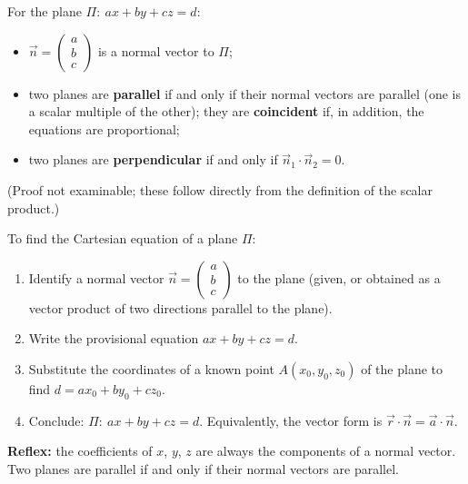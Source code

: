 \documentclass[11pt]{article}
\newcommand{\cle}[1]{{\popxbold\color{popdark}#1}}
\begin{document}
\begin{propriete}
For the plane $\Pi:\ ax+by+cz=d$:
\begin{itemize}
\item $\vec{n} = \begin{pmatrix} a \\ b \\ c \end{pmatrix}$ is a normal vector to $\Pi$;
\item two planes are \textbf{parallel} if and only if their normal vectors are parallel (one is a scalar multiple of the other); they are \textbf{coincident} if, in addition, the equations are proportional;
\item two planes are \textbf{perpendicular} if and only if $\vec{n}_1\cdot\vec{n}_2 = 0$.
\end{itemize}
(Proof not examinable; these follow directly from the definition of the scalar product.)
\end{propriete}

\begin{methode}
To find the Cartesian equation of a plane $\Pi$:
\begin{enumerate}
\item Identify a \cle{normal vector} $\vec{n} = \begin{pmatrix} a \\ b \\ c \end{pmatrix}$ to the plane (given, or obtained as a vector product of two directions parallel to the plane).
\item Write the provisional equation $ax + by + cz = d$.
\item Substitute the coordinates of a known point $A(x_0, y_0, z_0)$ of the plane to find $d = ax_0 + by_0 + cz_0$.
\item Conclude: $\Pi:\ ax + by + cz = d$. Equivalently, the vector form is $\vec{r}\cdot\vec{n} = \vec{a}\cdot\vec{n}$.
\end{enumerate}
\textbf{Reflex:} the coefficients of $x$, $y$, $z$ are always the components of a normal vector. Two planes are parallel if and only if their normal vectors are parallel.
\end{methode}
\end{document}
